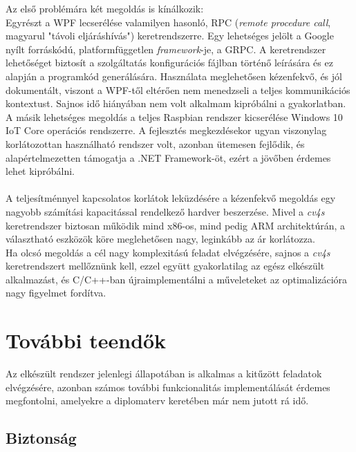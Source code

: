 Az első problémára két megoldás is kínálkozik:\\
Egyrészt a WPF lecserélése valamilyen hasonló, RPC (\emph{remote procedure call}, magyarul "távoli eljáráshívás") keretrendszerre. Egy lehetséges jelölt a Google nyílt forráskódú, platformfüggetlen \emph{framework}-je, a GRPC. A keretrendszer lehetőséget biztosít a szolgáltatás konfigurációs fájlban történő leírására és ez alapján a programkód generálására. Használata meglehetősen kézenfekvő, és jól dokumentált, viszont a WPF-től eltérően nem menedzseli a teljes kommunikációs kontextust. \cite{grpc} Sajnos idő hiányában nem volt alkalmam kipróbálni a gyakorlatban.\\
A másik lehetséges megoldás a teljes Raspbian rendszer kicserélése Windows 10 IoT Core operációs rendszerre. A fejlesztés megkezdésekor ugyan viszonylag korlátozottan használható rendszer volt, azonban ütemesen fejlődik, és alapértelmezetten támogatja a .NET Framework-öt, ezért a jövőben érdemes lehet kipróbálni.\\
\\
A teljesítménnyel kapcsolatos korlátok leküzdésére a kézenfekvő megoldás egy nagyobb számítási kapacitással rendelkező hardver beszerzése. Mivel a \emph{cv4s} keretrendszer biztosan működik mind x86-os, mind pedig ARM architektúrán, a választható eszközök köre meglehetősen nagy, leginkább az ár korlátozza.\\
Ha olcsó megoldás a cél nagy komplexitású feladat elvégzésére, sajnos a \emph{cv4s} keretrendszert mellőznünk kell, ezzel együtt gyakorlatilag az egész elkészült alkalmazást, és C/C++-ban újraimplementálni a műveleteket az optimalizációra nagy figyelmet fordítva. 

\section{További teendők}

Az elkészült rendszer jelenlegi állapotában is alkalmas a kitűzött feladatok elvégzésére, azonban számos további funkcionalitás implementálását érdemes megfontolni, amelyekre a diplomaterv keretében már nem jutott rá idő.

\subsection{Biztonság}

